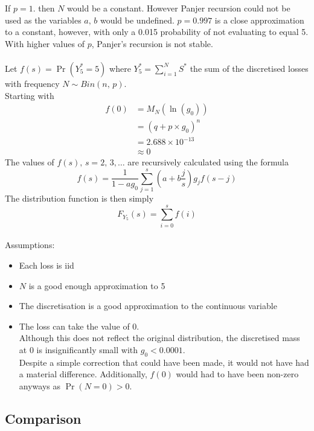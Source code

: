 \documentclass[titlepage]{article}
\begin{document}
	If $p = 1$. then $N$ would be a constant. However Panjer recursion could not be used as the variables $a,\,b$ would be undefined. $p=0.997$ is a close approximation to a constant, however, with only a 0.015 probability of not evaluating to equal 5. With higher values of $p$, Panjer's recursion is not stable.\\
	\\
	Let $f(s) = \Pr(Y^*_5=5)$ where $Y^*_5 = \sum_{i=1}^{N}S^*$ the sum of the discretised losses with frequency $N \sim Bin(n, \,p)$.\\
	Starting with
	\begin{align*}
		f(0)&=M_N(\ln(g_0))\\
		&=(q+p\times g_0)^n\\
		&=2.688 \times 10^{-13}\\
		&\approx 0
	\end{align*}
	The values of $f(s),\,s = 2,\,3,\ldots$ are recursively calculated using the formula
	\[f(s)=\frac{1}{1-ag_0}\sum_{j=1}^{s}\left(a+b\frac{j}{s}\right) g_jf(s-j)\]
	The distribution function is then simply
	\[F_{Y_5}(s) = \sum_{i=0}^{s}f(i)\]
	\\
	Assumptions:
	\begin{itemize}
		\item Each loss is iid
		\item $N$ is a good enough approximation to 5
		\item The discretisation is a good approximation to the continuous variable
		\item The loss can take the value of 0. \\Although this does not reflect the original distribution, the discretised mass at 0 is insignificantly small with $g_0<0.0001$. \\
		Despite a simple correction that could have been made, it would not have had a material difference. Additionally, $f(0)$ would had to have been non-zero anyways as $\Pr(N=0)>0$.
	\end{itemize}
	
	\subsection{Comparison}
	
\end{document}
